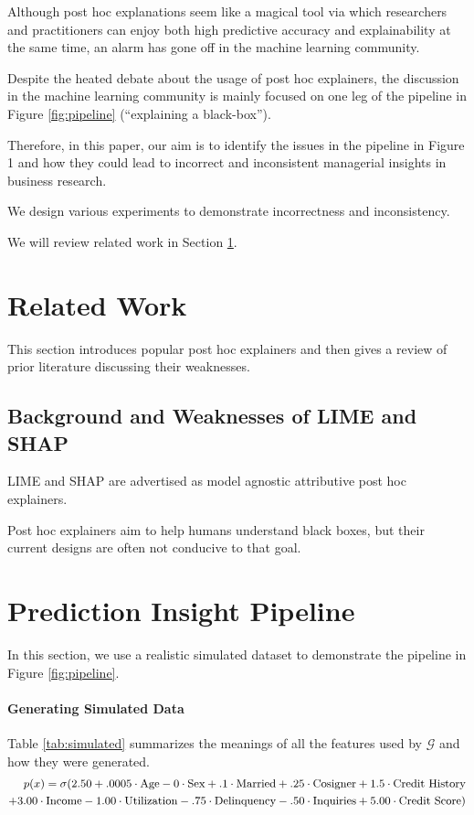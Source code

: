 \documentclass[11pt]{article}    %
\begin{document}
Although post hoc explanations seem like a magical tool via which researchers and practitioners can enjoy both high predictive accuracy and explainability at the same time, an alarm has gone off in the machine learning community. 

Despite the heated debate about the usage of post hoc explainers, the discussion in the machine learning community is mainly focused on one leg of the pipeline in Figure \ref{fig:pipeline}  (``explaining a black-box'').

Therefore, in this paper, our aim is to identify the issues in the pipeline in Figure 1 and how they could lead to incorrect and inconsistent managerial insights in business research. 

We design various experiments to demonstrate incorrectness and inconsistency.


    We will review related work in Section \ref{sec:related_work}. 
    
    \vspace{-3mm}
\section{Related Work}
    \label{sec:related_work}
   This section introduces popular post hoc explainers and then gives a review of prior literature discussing their weaknesses. 
   
    \subsection{Background and Weaknesses of LIME and SHAP}
        LIME and SHAP are advertised as model agnostic attributive post hoc explainers. 


Post hoc explainers aim to help humans understand black boxes, but their current designs are often not conducive to that goal. 


\section{Prediction Insight Pipeline}
\label{sec:dataset}
In this section, we use a realistic simulated dataset to demonstrate the pipeline in Figure \ref{fig:pipeline}.
 
 \paragraph{Generating Simulated Data}

Table \ref{tab:simulated} summarizes the meanings of all the features used by $\mathcal{G}$ and how they were generated. 
\begin{equation}
\label{eqn:gt}
\small
\begin{split}
 p(x) = \sigma(2.50 +.0005\cdot\text{Age} -0\cdot\text{Sex} +.1 \cdot \text{Married} + .25\cdot \text{Cosigner} + 1.5 \cdot \text{Credit History} \\  + 3.00 \cdot \text{Income} - 1.00\cdot\text{Utilization} -.75 \cdot \text{Delinquency} - .50\cdot\text{Inquiries} + 5.00\cdot\text{Credit Score})
\end{split}
\end{equation}
\end{document}
